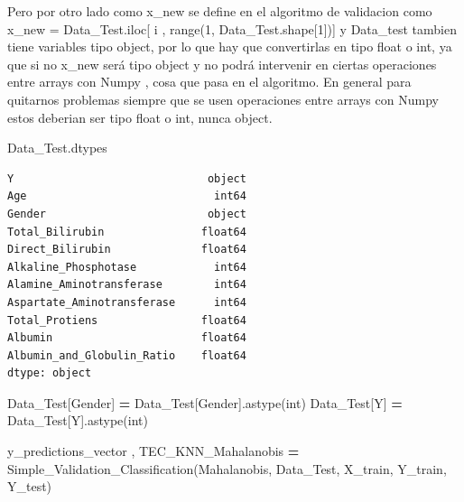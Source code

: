\documentclass[
  11pt,
  a4paper,
]{article}
\newenvironment{Shaded}{\begin{snugshade}}{\end{snugshade}}
\newcommand{\NormalTok}[1]{#1}
\newcommand{\OperatorTok}[1]{\textcolor[rgb]{0.81,0.36,0.00}{\textbf{#1}}}
\newcommand{\StringTok}[1]{\textcolor[rgb]{0.31,0.60,0.02}{#1}}
\begin{document}
Pero por otro lado como x\_new se define en el algoritmo de validacion
como x\_new = Data\_Test.iloc{[} i , range(1,
Data\_Test.shape{[}1{]}){]} y Data\_test tambien tiene variables tipo
object, por lo que hay que convertirlas en tipo float o int, ya que si
no x\_new será tipo object y no podrá intervenir en ciertas operaciones
entre arrays con Numpy , cosa que pasa en el algoritmo. En general para
quitarnos problemas siempre que se usen operaciones entre arrays con
Numpy estos deberian ser tipo float o int, nunca object.

\begin{Shaded}
\begin{Highlighting}[]
\NormalTok{Data\_Test.dtypes}
\end{Highlighting}
\end{Shaded}

\begin{verbatim}
Y                              object
Age                             int64
Gender                         object
Total_Bilirubin               float64
Direct_Bilirubin              float64
Alkaline_Phosphotase            int64
Alamine_Aminotransferase        int64
Aspartate_Aminotransferase      int64
Total_Protiens                float64
Albumin                       float64
Albumin_and_Globulin_Ratio    float64
dtype: object
\end{verbatim}

\begin{Shaded}
\begin{Highlighting}[]
\NormalTok{Data\_Test[}\StringTok{\textquotesingle{}Gender\textquotesingle{}}\NormalTok{] }\OperatorTok{=}\NormalTok{ Data\_Test[}\StringTok{\textquotesingle{}Gender\textquotesingle{}}\NormalTok{].astype(}\StringTok{\textquotesingle{}int\textquotesingle{}}\NormalTok{)}
\NormalTok{Data\_Test[}\StringTok{\textquotesingle{}Y\textquotesingle{}}\NormalTok{] }\OperatorTok{=}\NormalTok{ Data\_Test[}\StringTok{\textquotesingle{}Y\textquotesingle{}}\NormalTok{].astype(}\StringTok{\textquotesingle{}int\textquotesingle{}}\NormalTok{)}
\end{Highlighting}
\end{Shaded}

\begin{Shaded}
\begin{Highlighting}[]
\NormalTok{y\_predictions\_vector , TEC\_KNN\_Mahalanobis }\OperatorTok{=}\NormalTok{ Simple\_Validation\_Classification(}\StringTok{\textquotesingle{}Mahalanobis\textquotesingle{}}\NormalTok{, Data\_Test, X\_train, Y\_train, Y\_test)}
\end{Highlighting}
\end{Shaded}
\end{document}
